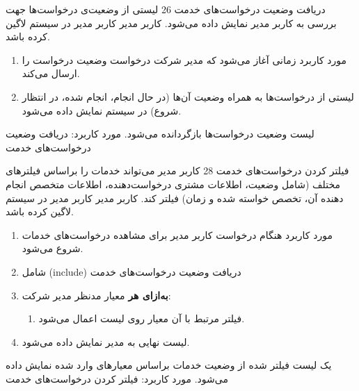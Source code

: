 
{
\usecase
{دریافت وضعیت درخواست‌های خدمت}
{26}
{لیستی از وضعیت‌ی درخواست‌ها جهت بررسی به کاربر مدیر نمایش داده می‌شود.}
{کاربر مدیر}
{}
{کاربر مدیر در سیستم لاگین کرده باشد.}
{
	\vspace*{-0.6cm}
	\begin{enumerate}
		\item مورد کاربرد زمانی آغاز می‌شود که مدیر شرکت درخواست وضعیت درخواست را ارسال می‌کند.
		\item 
		لیستی از درخواست‌ها به همراه وضعیت آن‌ها (در حال انجام، انجام شده، در انتظار شروع) در سیستم نمایش داده می‌شود.
	\end{enumerate}
}
{لیست وضعیت درخواست‌ها بازگردانده می‌شود.}
{
}
{
	مورد کاربرد: دریافت وضعیت درخواست‌های خدمت
}
}

{
\usecase
{
	فیلتر کردن درخواست‌های خدمت
}
{28}
{کاربر مدیر می‌تواند خدمات را براساس فیلتر‌های مختلف (شامل وضعیت، اطلاعات مشتری درخواست‌دهنده،‌ اطلاعات متخصص انجام دهنده آن، تخصص خواسته شده و زمان) فیلتر کند. }
{کاربر مدیر}
{}
{کاربر مدیر در سیستم لاگین کرده باشد.}
{
	\vspace*{-0.6cm}
	\begin{enumerate}
		\item مورد کاربرد هنگام درخواست کاربر مدیر برای مشاهده درخواست‌های خدمات شروع می‌شود.
		\item 
شامل	(include) دریافت وضعیت درخواست‌های خدمت
		\item
		\textbf{به‌ازای هر} معیار مدنظر مدیر شرکت:
		\begin{enumerate}[label=\theenumi.\arabic*.]
			\item فیلتر مرتبط با آن معیار روی لیست اعمال می‌شود.
		\end{enumerate}
		\item لیست نهایی به مدیر نمایش داده می‌شود.
	\end{enumerate}
}
{یک لیست فیلتر شده از وضعیت خدمات براساس معیارهای وارد شده نمایش داده می‌شود.}
{
}
{
	مورد کاربرد: فیلتر کردن درخواست‌های خدمت
}
}

